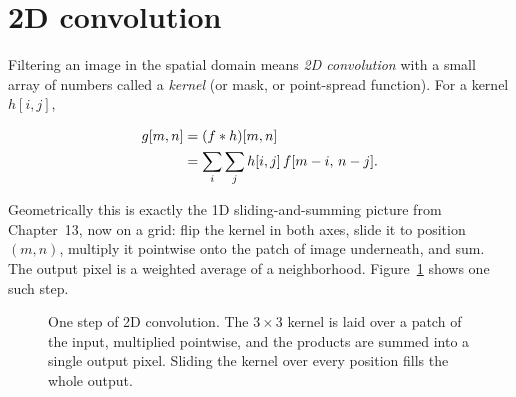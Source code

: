 \section{2D convolution}
\label{ch31:conv}

Filtering an image in the spatial domain means \emph{2D convolution} with a small
array of numbers called a \emph{kernel} (or mask, or point-spread function). For a
kernel $h[i,j]$,

\begin{align}
g[m,n] &= (f \ast h)[m,n] \notag \\
&= \sum_{i}\sum_{j} h[i,j]\, f[m-i,\,n-j].
\label{ch31:conv2d}
\end{align}

Geometrically this is exactly the 1D sliding-and-summing picture from
Chapter~13, now on a grid: flip the kernel in both axes, slide it to position
$(m,n)$, multiply it pointwise onto the patch of image underneath, and sum. The
output pixel is a weighted average of a neighborhood.
Figure~\ref{ch31:fig-conv} shows one such step.

\begin{figure}[H]
\centering
{}
\caption{One step of 2D convolution. The $3\times3$ kernel is laid over a patch of
the input, multiplied pointwise, and the products are summed into a single output
pixel. Sliding the kernel over every position fills the whole output.}
\label{ch31:fig-conv}
\end{figure}

